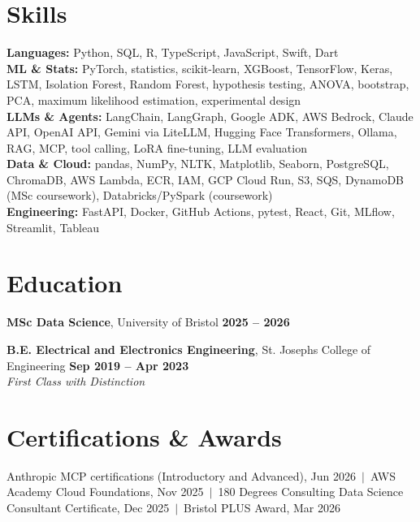 \documentclass[a4paper,10pt]{article}
\begin{document}
\section{Skills}
\textbf{Languages:} Python, SQL, R, TypeScript, JavaScript, Swift, Dart\\
\textbf{ML \& Stats:} PyTorch, statistics, scikit-learn, XGBoost, TensorFlow, Keras, LSTM, Isolation Forest, Random Forest, hypothesis testing, ANOVA, bootstrap, PCA, maximum likelihood estimation, experimental design\\
\textbf{LLMs \& Agents:} LangChain, LangGraph, Google ADK, AWS Bedrock, Claude API, OpenAI API, Gemini via LiteLLM, Hugging Face Transformers, Ollama, RAG, MCP, tool calling, LoRA fine-tuning, LLM evaluation\\
\textbf{Data \& Cloud:} pandas, NumPy, NLTK, Matplotlib, Seaborn, PostgreSQL, ChromaDB, AWS Lambda, ECR, IAM, GCP Cloud Run, S3, SQS, DynamoDB (MSc coursework), Databricks/PySpark (coursework)\\
\textbf{Engineering:} FastAPI, Docker, GitHub Actions, pytest, React, Git, MLflow, Streamlit, Tableau

\section{Education}
\textbf{MSc Data Science}, University of Bristol \hfill \textbf{2025 – 2026}\par
\vspace{2pt}
\textbf{B.E. Electrical and Electronics Engineering}, St. Joseph\textquotesingle{}s College of Engineering \hfill \textbf{Sep 2019 – Apr 2023}\\ \textit{First Class with Distinction}\par

\section{Certifications \& Awards}
Anthropic MCP certifications (Introductory and Advanced), Jun 2026 \,$|$\, AWS Academy Cloud Foundations, Nov 2025 \,$|$\, 180 Degrees Consulting Data Science Consultant Certificate, Dec 2025 \,$|$\, Bristol PLUS Award, Mar 2026
\end{document}
